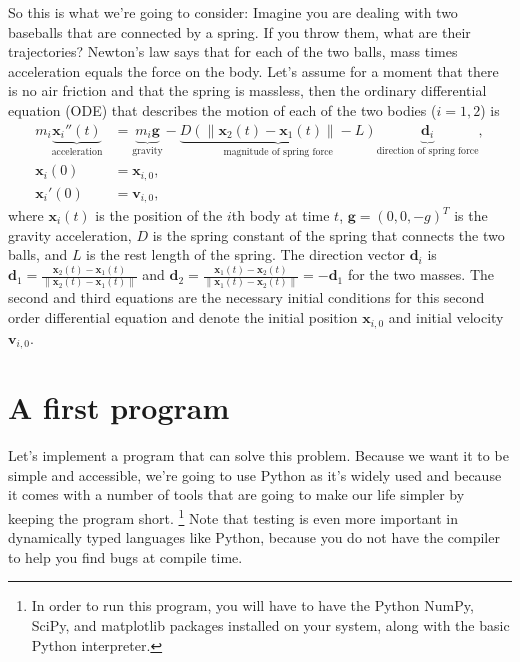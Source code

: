 \documentclass{article}
\begin{document}
So this is what we're going to consider: Imagine you are dealing with two
baseballs that
are connected by a spring. If you throw them, what are their trajectories?
Newton's law says that for each of the two balls, mass times acceleration
equals the force on the body. Let's assume for a moment that there is no air
friction and that the spring is massless, then the ordinary differential
equation (ODE) that describes the motion of each of the two bodies ($i=1,2$) is
\begin{align}
  \label{eq:ode}
  m_i 
  \underbrace{\mathbf x_i''(t)}_{\text{acceleration}}
  &=
  \underbrace{m_i \mathbf g}_{\text{gravity}}
  -
  \underbrace{D (\|\mathbf x_2(t) - \mathbf x_1(t)\| - L)}_{\text{magnitude of
    spring force}}
\underbrace{\mathbf d_i}_{\text{direction of spring force}},
\\
\label{eq:ic1}
  \mathbf x_i(0) &= \mathbf x_{i,0},
\\
\label{eq:ic2}
  \mathbf x_i'(0) &= \mathbf v_{i,0},
\end{align}
where $\mathbf x_i(t)$ is the position of the $i$th body at time $t$, $\mathbf
g=(0,0,-g)^T$ is the gravity acceleration, $D$ is the spring constant of
the spring that connects the two balls, and $L$ is the rest length of the
spring. The direction vector $\mathbf d_i$ is
$\mathbf d_1 = \frac{\mathbf x_2(t) - \mathbf x_1(t)}{\|\mathbf x_2(t) - \mathbf
    x_1(t)\|}$
and
$\mathbf d_2 = \frac{\mathbf x_1(t) - \mathbf x_2(t)}{\|\mathbf x_1(t) - \mathbf
    x_2(t)\|}=-\mathbf d_1$ for the two masses.
The second and third equations are the necessary initial conditions
for this second order differential equation and denote the initial position
$\mathbf x_{i,0}$ and initial velocity $\mathbf v_{i,0}$.

\section{A first program}
\label{sec:first-steps}

Let's implement a program that can solve this problem. Because we want it
to be simple and accessible, we're going to use Python as it's widely used and
because it comes with a number of tools that are going to make our life
simpler by keeping the program short.%
\footnote{In order to run this program, you will have to have the Python
  NumPy, SciPy, and matplotlib packages installed on your system, along with
  the basic Python interpreter.}
Note that testing is even more important in dynamically typed languages like
Python, because you do not have the compiler to help you find bugs at compile 
time.
  
\end{document}
